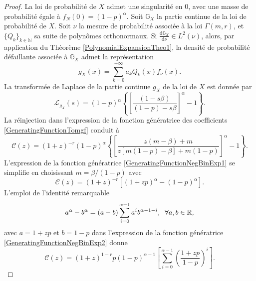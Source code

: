 \begin{proof}
La loi de probabilité de $X$ admet une singularité en $0$, avec une masse de probabilité égale à $f_{N}(0)=(1-p)^{\alpha}$. Soit $\mathbb{G}_{X}$ la partie continue de la loi de probabilité de $X$. Soit $\nu$ la mesure de probabilité associée à la loi $\Gamma(m,r)$, et $\{Q_{k}\}_{k\in\mathbb{N}}$ sa suite de polynômes orthonormaux. Si $\frac{\text{d}\mathbb{G}_{X}}{\text{d}\nu}\in L^{2}(\nu)$, alors, par application du Thèorème \ref{PolynomialExpansionTheo1}, la densité de probabilité défaillante associée à $\mathbb{G}_{X}$ admet la représentation
\begin{equation}\label{DensityNegativeBinomialCompoundExponentialPolynomialExpansion}
g_{X}(x)=\sum_{k=0}^{+\infty}a_{k}Q_{k}(x)f_{\nu}(x).
\end{equation}
La transformée de Laplace de la partie continue $g_{X}$ de la loi de $X$ est donnée par
\begin{equation}\label{LaplaceTransformContinuousPartNegativeBinomialCompoundExponential}
\mathcal{L}_{g_{X}}(s)=(1-p)^{\alpha}\left\{\left[\frac{(1-s\beta)}{(1-p)-s\beta}\right]^{\alpha}-1\right\}.
\end{equation}
La réinjection dans l\rq{}expression de la fonction génératrice des coefficients \eqref{GeneratingFunctionTomgf} conduit à
\begin{equation}\label{GeneratingFunctionNegBinExp1}
\mathcal{C}(z)=(1+z)^{-r}(1-p)^{\alpha}\left\{\left[\frac{z(m-\beta)+m}{z\left[m(1-p)-\beta\right]+m(1-p)}\right]^{\alpha}-1\right\}.
\end{equation}
L'expression de la fonction génératrice \eqref{GeneratingFunctionNegBinExp1} se simplifie en choisissant $m=\beta/(1-p)$ avec 
\begin{equation}\label{GeneratingFunctionNegBinExp2}
\mathcal{C}(z)=(1+z)^{-r}\left[(1+zp)^{\alpha}-(1-p)^{\alpha}\right].
\end{equation}
L\rq{}emploi de l\rq{}identité remarquable 
\begin{equation*}
a^{\alpha}-b^{\alpha}=(a-b)\sum_{i=0}^{\alpha-1}a^{i}b^{\alpha-1-i},\hspace{0.2cm}\forall a,b\in\mathbb{R},
\end{equation*}
avec $a=1+zp$ et $b=1-p$ dans l\rq{}expression de la fonction génératrice \eqref{GeneratingFunctionNegBinExp2} donne 
\begin{equation}\label{GeneratingFunctionNegBinExp3}
\mathcal{C}(z)=(1+z)^{1-r}p(1-p)^{\alpha-1}\left[\sum_{i=0}^{\alpha-1}\left(\frac{1+zp}{1-p}\right)^{i}\right].

\end{equation}
\end{proof}
